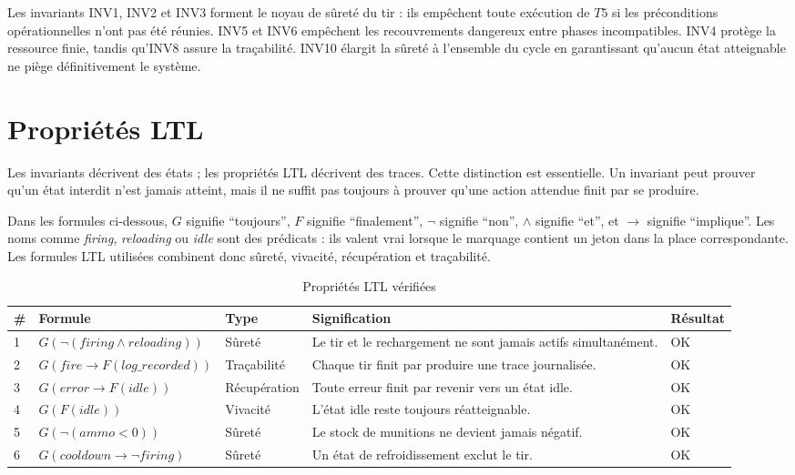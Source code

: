 \documentclass[11pt,a4paper]{report}
\begin{document}
Les invariants INV1, INV2 et INV3 forment le noyau de sûreté du tir : ils empêchent toute exécution de $T5$ si les préconditions opérationnelles n'ont pas été réunies. INV5 et INV6 empêchent les recouvrements dangereux entre phases incompatibles. INV4 protège la ressource finie, tandis qu'INV8 assure la traçabilité. INV10 élargit la sûreté à l'ensemble du cycle en garantissant qu'aucun état atteignable ne piège définitivement le système.

\section{Propriétés LTL}
Les invariants décrivent des états ; les propriétés LTL décrivent des traces. Cette distinction est essentielle. Un invariant peut prouver qu'un état interdit n'est jamais atteint, mais il ne suffit pas toujours à prouver qu'une action attendue finit par se produire.

Dans les formules ci-dessous, $G$ signifie ``toujours'', $F$ signifie ``finalement'', $\neg$ signifie ``non'', $\land$ signifie ``et'', et $\rightarrow$ signifie ``implique''. Les noms comme \emph{firing}, \emph{reloading} ou \emph{idle} sont des prédicats : ils valent vrai lorsque le marquage contient un jeton dans la place correspondante. Les formules LTL utilisées combinent donc sûreté, vivacité, récupération et traçabilité.

\begin{table}[H]
\centering
\caption{Propriétés LTL vérifiées}
\small
\begin{tabularx}{\textwidth}{p{0.6cm}p{3.4cm}p{2.4cm}Yp{1.6cm}}
\toprule
\# & Formule & Type & Signification & Résultat \\
 & $G(\neg(firing \land reloading))$ & Sûreté & Le tir et le rechargement ne sont jamais actifs simultanément. & OK \\
2 & $G(fire \rightarrow F(log\_recorded))$ & Traçabilité & Chaque tir finit par produire une trace journalisée. & OK \\
3 & $G(error \rightarrow F(idle))$ & Récupération & Toute erreur finit par revenir vers un état idle. & OK \\
4 & $G(F(idle))$ & Vivacité & L'état idle reste toujours réatteignable. & OK \\
5 & $G(\neg(ammo < 0))$ & Sûreté & Le stock de munitions ne devient jamais négatif. & OK \\
6 & $G(cooldown \rightarrow \neg firing)$ & Sûreté & Un état de refroidissement exclut le tir. & OK \\
\bottomrule
\end{tabularx}
\end{table}
\end{document}
